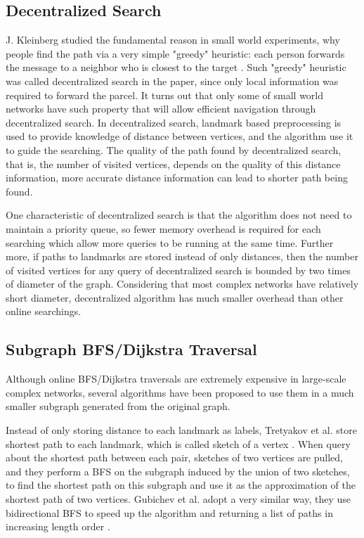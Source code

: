 \subsection{Decentralized Search}

J. Kleinberg studied the fundamental reason in small world experiments, why people find the path via a very simple "greedy" heuristic: each person forwards the message to a neighbor who is closest to the target \cite{Kleinberg:2000p5066}. Such "greedy" heuristic was called decentralized search in the paper, since only local information was required to forward the parcel. It turns out that only some of small world networks have such property that will allow efficient navigation through decentralized search. In decentralized search, landmark based preprocessing is used to provide knowledge of distance between vertices, and the algorithm use it to guide the searching. The quality of the path found by decentralized search, that is, the number of visited vertices, depends on the quality of this distance information, more accurate distance information can lead to shorter path being found. 

One characteristic of decentralized search is that the algorithm does not need to maintain a priority queue, so fewer memory overhead is required for each searching which allow more queries to be running at the same time. Further more, if paths to landmarks are stored instead of only distances, then the number of visited vertices for any query of decentralized search is bounded by two times of diameter of the graph. Considering that most complex networks have relatively short diameter, decentralized algorithm has much smaller overhead than other online searchings.

\subsection{Subgraph BFS/Dijkstra Traversal}

Although online BFS/Dijkstra traversals are extremely expensive in large-scale complex networks, several algorithms have been proposed to use them in a much smaller subgraph generated from the original graph.

Instead of only storing distance to each landmark as labels, Tretyakov et al. store shortest path to each landmark, which is called sketch of a vertex \cite{tretyakov2011fast}. When query about the shortest path between each pair, sketches of two vertices are pulled, and they perform a BFS on the subgraph induced by the union of two sketches, to find the shortest path on this subgraph and use it as the approximation of the shortest path of two vertices. Gubichev et al. adopt a very similar way, they use bidirectional BFS to speed up the algorithm and returning a list of paths in increasing length order \cite{Gubichev:2010:FAE:1871437.1871503}. 
